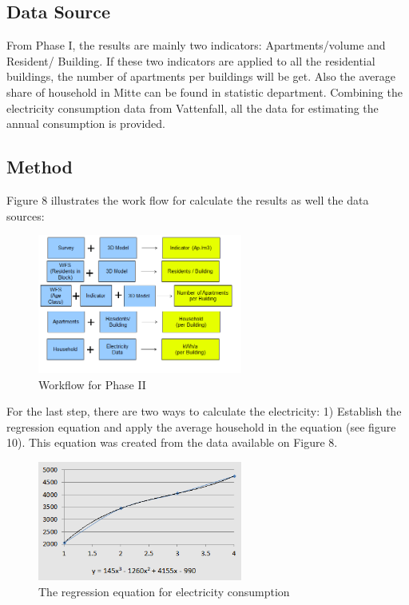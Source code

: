 \subsection{Data Source}
From Phase I, the results are mainly two indicators: Apartments/volume and Resident/ Building. If these two indicators are applied to all the residential buildings, the number of apartments per buildings will be get. Also the average share of household in Mitte can be found in statistic department.\citep{statsberlin} Combining the electricity consumption data from Vattenfall, all the data for estimating the annual consumption is provided.

\subsection{Method}
Figure 8 illustrates the work flow for calculate the results as well the data sources:

\begin{figure}[htb!]
	\centering
	\includegraphics[width=0.6\textwidth]{phase2/group3/fig10.png}
	\caption{Workflow for Phase II }
	\label{fig:figure10}
\end{figure}

For the last step, there are two ways to calculate the electricity:
1) Establish the regression equation and apply the average household in the equation (see figure 10). This equation was created from the data available on Figure 8.

\begin{figure}[H]
	\centering
	\includegraphics[width=0.6\textwidth]{phase2/group3/fig11.png}
	\caption{The regression equation for electricity consumption}
	\label{fig:figure11}
\end{figure}

